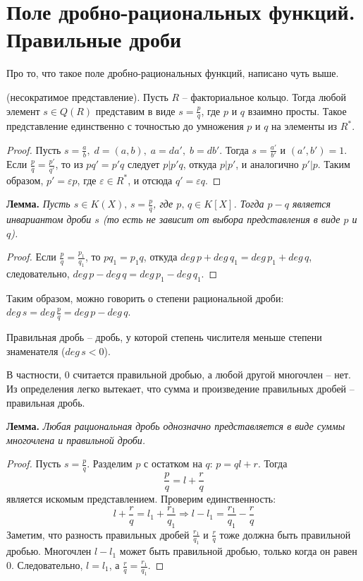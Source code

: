 \section{Поле дробно-рациональных функций. Правильные дроби}
Про то, что такое поле дробно-рациональных функций, написано чуть выше.
\begin{theorem-non}
    (несократимое представление). Пусть $R$ -- факториальное кольцо. Тогда любой элемент $s \in Q(R)$ представим в виде $s = \frac{p}{q}$, 
    где $p$ и $q$ взаимно просты. Такое представление единственно с точностью до умножения $p$ и $q$ на элементы из $R^*$.
\end{theorem-non}

\begin{proof}
    Пусть $s = \frac{a}{b}, \; d = (a, b), \; a = da', \; b = db'$. 
    Тогда $s = \frac{a'}{b'}$ и $(a', b') = 1$. 
    Если $\frac{p}{q} = \frac{p'}{q'}$, то из $pq' = p'q$ следует $p|p'q$, откуда $p|p'$, и аналогично $p'|p$. 
    Таким образом, $p' = \varepsilon p$, где $\varepsilon \in R^*$, и отсюда $q' = \varepsilon q$.
\end{proof}

\textbf{Лемма.}
\textit{Пусть $s \in K(X), \, s = \frac{p}{q}$, где $p, \, q \in K[X]$. Тогда $p - q$ является инвариантом дроби $s$
(то есть не зависит от выбора представления в виде $p$ и $q$).}

\begin{proof}
    Если $\frac{p}{q} = \frac{p_1}{q_1}$, то $pq_1 = p_1q$, откуда $deg \, p + deg \, q_1 = deg \, p_1 + deg \, q$, следовательно, $deg \, p - deg \, q = deg \, p_1 - deg \, q_1$.
\end{proof}

\vspace{3mm}

Таким образом, можно говорить о степени рациональной дроби: $deg \, s = deg \, \frac{p}{q} = deg \, p - deg \, q$.
\begin{conj}
    Правильная дробь -- дробь, у которой степень числителя меньше степени знаменателя ($deg \, s < 0$).
\end{conj}

В частности, 0 считается правильной дробью, а любой другой многочлен -- нет. 
Из определения легко вытекает, что сумма и произведение правильных дробей -- правильная дробь.

\textbf{Лемма.}
\textit{Любая рациональная дробь однозначно представляется в виде суммы многочлена и правильной дроби.}

\begin{proof}
    Пусть $s = \frac{p}{q}$. Разделим $p$ с остатком на $q$: $p = ql + r$. 
    Тогда \[\frac{p}{q} = l + \frac{r}{q} \] является искомым представлением.
    Проверим единственность: \[ l + \frac{r}{q} = l_1 + \frac{r_1}{q_1} \Rightarrow l - l_1 = \frac{r_1}{q_1} - \frac{r}{q} \]
    Заметим, что разность правильных дробей $\frac{r_1}{q_1}$ и $\frac{r}{q}$ тоже должна быть правильной дробью.
    Многочлен $l - l_1$ может быть правильной дробью, только когда он равен 0. Следовательно, $l = l_1$, а $\frac{r}{q} = \frac{r_1}{q_1}$. 
\end{proof}